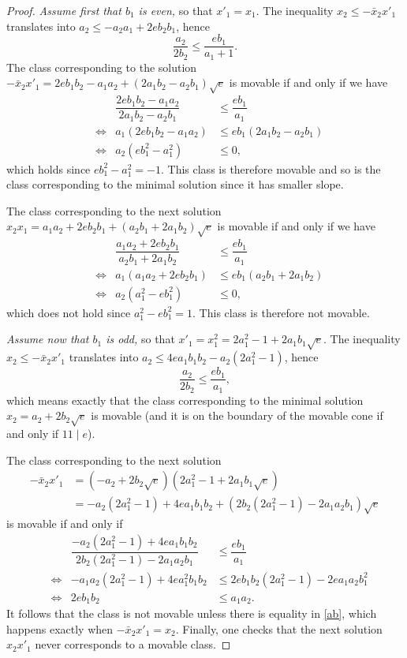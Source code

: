 \documentclass[11pt]{article}
\theoremstyle{definition}
\begin{document}
\begin{proof}
\emph{Assume first that $b_1$ is even,} so that $x'_1=x_1$. The inequality $x_2\le -\bar x_2x'_1 $ translates into $a_2\le -a_2a_1+2eb_2b_1$, hence
\begin{equation}\label{slope}
\frac{a_2}{2b_2}\le \frac{eb_1}{a_1+1}.
\end{equation}
The class corresponding to the solution $-\bar x_2x'_1=
2eb_1b_2 -a_1a_2 +(2a_1b_2-a_2b_1) \sqrt{e}$
is movable if and only if we have
\[
\begin{aligned}
&& \dfrac{2eb_1b_2-a_1a_2}{2a_1b_2-a_2b_1}&\le \dfrac{eb_1}{a_1}\\
&\iff& a_1(2eb_1b_2-a_1a_2)&\le eb_1(2a_1b_2-a_2b_1)\\
&\iff& a_2(eb_1^2-a_1^2)&\le 0,
\end{aligned}
\]
which holds since
$eb_1^2-a_1^2=-1$. This class is therefore movable and so is the class corresponding to the minimal solution since it has smaller slope.

The class corresponding to the next solution $x_2x_1=
a_1a_2+2eb_2b_1 +(a_2b_1+2a_1b_2) \sqrt{e}$ is movable if and only if we have
\[
\begin{aligned}
&& \dfrac{a_1a_2+2eb_2b_1}{a_2b_1+2a_1b_2}&\le \dfrac{eb_1}{a_1}\\
&\iff& a_1(a_1a_2+2eb_2b_1)&\le eb_1(a_2b_1+2a_1b_2)\\
&\iff& a_2(a_1^2-eb_1^2)&\le 0,
\end{aligned}
\]
which does not hold since $a_1^2-eb_1^2 =1$. This class is therefore not movable.

\emph{Assume now that $b_1$ is odd,} so that $x'_1=x_1^2=2a_1^2-1+2a_1b_1\sqrt{e}$. The inequality $x_2\le -\bar x_2x'_1 $ translates into $a_2\le 4ea_1b_1b_2-a_2(2a_1^2-1)$, hence
\begin{equation}\label{ab}
\frac{a_2}{2b_2}\le \dfrac{eb_1}{a_1},
\end{equation}
which means exactly that the class corresponding to the minimal solution $ x_2=a_2 +2b_2 \sqrt{e}$
is movable (and it is on the boundary of the movable cone if and only if $11\mid e$).

The class corresponding to the next solution
\begin{align*}
-\bar x_2x'_1&=
(-a_2 +2b_2 \sqrt{e})(2a_1^2-1+2a_1b_1\sqrt{e})
\\&
=-a_2(2a_1^2-1)+4ea_1b_1b_2+(2b_2(2a_1^2-1)-2a_1a_2b_1)\sqrt{e}
\end{align*}
is movable if and only if
\[
\begin{aligned}
&& \dfrac{-a_2(2a_1^2-1)+4ea_1b_1b_2}{2b_2(2a_1^2-1)-2a_1a_2b_1}&\le \dfrac{eb_1}{a_1}\\
&\iff& -a_1a_2(2a_1^2-1)+4ea_1^2b_1b_2&\le 2eb_1b_2(2a_1^2-1)-2ea_1a_2b_1^2\\
&\iff&2eb_1b_2 &\le a_1a_2.
\end{aligned}
\]
It follows that the class is not movable unless there is equality in \eqref{ab}, which happens exactly when
$-\bar x_2x'_1=x_2$. Finally, one checks that the next solution $ x_2x'_1$ never corresponds to a movable class.
\end{proof}
\end{document}
